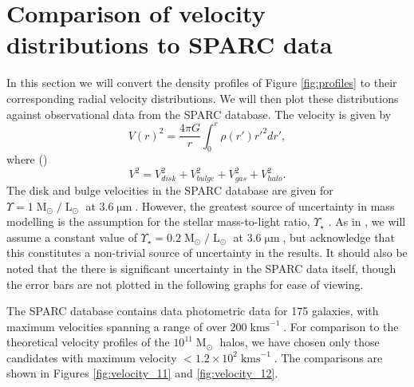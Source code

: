 \documentclass[a4paper,11pt]{article}
\begin{document}
\section{Comparison of velocity distributions to SPARC data}

In this section we will convert the density profiles of Figure \ref{fig:profiles} to their corresponding radial velocity distributions. We will then plot these distributions against observational data from the SPARC database. The velocity is given by
\begin{equation}
    V(r)^2 = \frac{4\pi G}{r}\int_0^r \rho(r')r'^2 dr',
\end{equation}
where (\cite{Sofue:2008wt})
\begin{equation}
    V^2 = V_{disk}^2 + V_{bulge}^2 + V_{gas}^2 + V_{halo}^2.
\end{equation}
The disk and bulge velocities in the SPARC database are given for $\Upsilon = 1 \operatorname{M}_{\odot}/\operatorname{L}_{\odot}$ at $3.6\operatorname{\mu m}$. However, the greatest source of uncertainty in mass modelling is the assumption for the stellar mass-to-light ratio, $\Upsilon_\star$ \cite{Lelli:2016zqa}. As in \cite{Robles:2018fur}, we will assume a constant value of $\Upsilon_\star = 0.2 \operatorname{M}_{\odot}/\operatorname{L}_{\odot}$ at $3.6\operatorname{\mu m}$, but acknowledge that this constitutes a non-trivial source of uncertainty in the results. It should also be noted that the there is significant uncertainty in the SPARC data itself, though the error bars are not plotted in the following graphs for ease of viewing. 

The SPARC database contains data photometric data for 175 galaxies, with maximum velocities spanning a range of over $200 \operatorname{kms}^{-1}$. For comparison to the theoretical velocity profiles of the $10^{11}\operatorname{M}_{\odot}$ halos, we have chosen only those candidates with maximum velocity $< 1.2\times 10^2 \operatorname{kms}^{-1}$. The comparisons are shown in Figures \ref{fig:velocity_11} and \ref{fig:velocity_12}.
\end{document}

